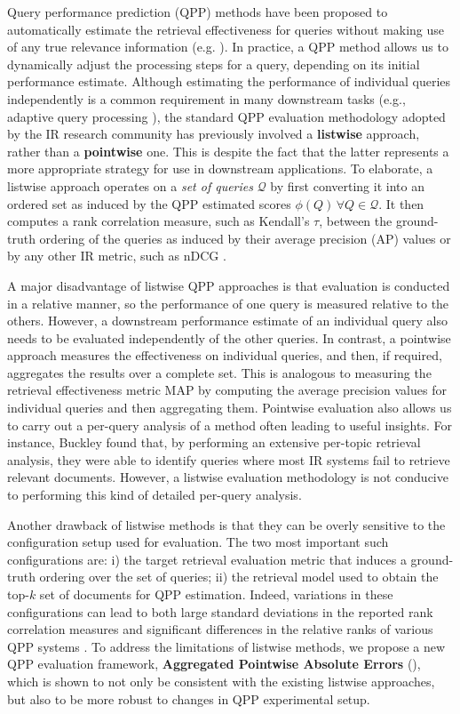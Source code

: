 Query performance prediction (QPP) methods have been proposed to automatically estimate the retrieval effectiveness for queries without making use of any true relevance information (e.g. \cite{qpp_croft_cikm06,uef_kurland_sigir10}).
In practice, a QPP method allows us to dynamically adjust the processing steps for a query, depending on its initial performance estimate. 
Although estimating the performance of individual queries independently is a common requirement in many downstream tasks (e.g., adaptive query processing \cite{adaptive_prf}), the standard QPP evaluation methodology adopted by the IR research community has previously involved a \textbf{listwise} approach, rather than a \textbf{pointwise} one. This is despite the fact that the latter represents a more appropriate strategy for use in downstream applications. To elaborate,
a listwise approach operates on a \emph{set of queries} $\mathcal{Q}$ by first converting it into an ordered set as induced by the QPP estimated scores $\phi(Q)\,\forall Q \in \mathcal{Q}$. It then computes a rank correlation measure, such as Kendall's $\tau$, 
between the ground-truth ordering of the queries as induced by their average precision (AP) values \cite{Cummins14} or by any other IR metric, such as nDCG \cite{hamed_neuralqpp}.

A major disadvantage of listwise QPP approaches is that evaluation is conducted in a relative manner, so the performance of one query is measured relative to the others. However, a downstream performance estimate of an individual query also needs to be evaluated independently of the other queries. In contrast, a pointwise approach measures the effectiveness on individual queries, and then, if required, aggregates the results over a complete set. This is analogous to measuring the retrieval effectiveness metric MAP by computing the average precision values for individual queries and then aggregating them.
Pointwise evaluation also allows us to carry out a per-query analysis of a method often leading to useful insights. For instance, Buckley \cite{ria} found that, by performing an extensive per-topic retrieval analysis, they were able to identify queries where most IR systems fail to retrieve relevant documents. However, a listwise evaluation methodology is not conducive to performing this kind of detailed per-query analysis.

Another drawback of listwise methods is that they can be overly sensitive to the configuration setup used for evaluation. The two most important such configurations are: i) the target retrieval evaluation metric that induces a ground-truth ordering over the set of queries; ii) the retrieval model used to obtain the top-$k$ set of documents for QPP estimation. Indeed, variations in these configurations can lead to both large standard deviations in the reported rank correlation measures and significant differences in the relative ranks of various QPP systems \cite{dg22ecir}.
To address the limitations of listwise methods, we propose a new QPP evaluation framework, \textbf{Aggregated Pointwise Absolute Errors} (\textbf{\proposed}), which is shown to not only be consistent with the existing listwise approaches, but also to be more robust to changes in QPP experimental setup.